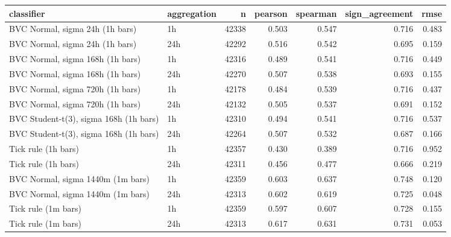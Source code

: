 \begin{tabular}{llrrrrr}
\toprule
classifier & aggregation & n & pearson & spearman & sign_agreement & rmse \\
\midrule
BVC Normal, sigma 24h (1h bars) & 1h & 42338 & 0.503 & 0.547 & 0.716 & 0.483 \\
BVC Normal, sigma 24h (1h bars) & 24h & 42292 & 0.516 & 0.542 & 0.695 & 0.159 \\
BVC Normal, sigma 168h (1h bars) & 1h & 42316 & 0.489 & 0.541 & 0.716 & 0.449 \\
BVC Normal, sigma 168h (1h bars) & 24h & 42270 & 0.507 & 0.538 & 0.693 & 0.155 \\
BVC Normal, sigma 720h (1h bars) & 1h & 42178 & 0.484 & 0.539 & 0.716 & 0.437 \\
BVC Normal, sigma 720h (1h bars) & 24h & 42132 & 0.505 & 0.537 & 0.691 & 0.152 \\
BVC Student-t(3), sigma 168h (1h bars) & 1h & 42310 & 0.494 & 0.541 & 0.716 & 0.537 \\
BVC Student-t(3), sigma 168h (1h bars) & 24h & 42264 & 0.507 & 0.532 & 0.687 & 0.166 \\
Tick rule (1h bars) & 1h & 42357 & 0.430 & 0.389 & 0.716 & 0.952 \\
Tick rule (1h bars) & 24h & 42311 & 0.456 & 0.477 & 0.666 & 0.219 \\
BVC Normal, sigma 1440m (1m bars) & 1h & 42359 & 0.603 & 0.637 & 0.748 & 0.120 \\
BVC Normal, sigma 1440m (1m bars) & 24h & 42313 & 0.602 & 0.619 & 0.725 & 0.048 \\
Tick rule (1m bars) & 1h & 42359 & 0.597 & 0.607 & 0.728 & 0.155 \\
Tick rule (1m bars) & 24h & 42313 & 0.617 & 0.631 & 0.731 & 0.053 \\
\bottomrule
\end{tabular}
